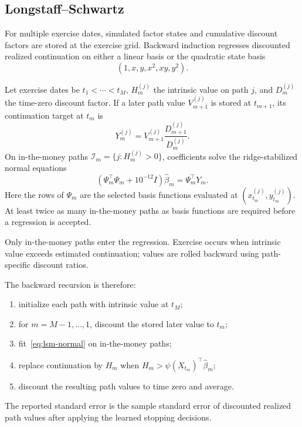 \documentclass[11pt]{article}
\numberwithin{equation}{section}
\theoremstyle{definition}
\theoremstyle{remark}
\begin{document}
\subsection{Longstaff--Schwartz}

For multiple exercise dates, simulated factor states and cumulative discount
factors are stored at the exercise grid. Backward induction regresses discounted
realized continuation on either a linear basis or the quadratic state basis
\begin{equation}
  (1,x,y,x^2,xy,y^2).
\end{equation}

Let exercise dates be $t_1<\cdots<t_M$, $H_m^{(j)}$ the intrinsic value on
path $j$, and $D_m^{(j)}$ the time-zero discount factor. If a later path value
$V_{m+1}^{(j)}$ is stored at $t_{m+1}$, its continuation target at $t_m$ is
\begin{equation}
  Y_m^{(j)}
  =V_{m+1}^{(j)}\frac{D_{m+1}^{(j)}}{D_m^{(j)}}.
\end{equation}
On in-the-money paths $\mathcal I_m=\{j:H_m^{(j)}>0\}$, coefficients solve the
ridge-stabilized normal equations
\begin{equation}
  (\Psi_m^\top\Psi_m+10^{-12}I)\widehat{\beta}_m
  =\Psi_m^\top Y_m.
  \label{eq:lsm-normal}
\end{equation}
Here the rows of $\Psi_m$ are the selected basis functions evaluated at
$(x_{t_m}^{(j)},y_{t_m}^{(j)})$. At least twice as many in-the-money paths as
basis functions are required before a regression is accepted.

Only in-the-money paths enter the regression. Exercise occurs when intrinsic
value exceeds estimated continuation; values are rolled backward using
path-specific discount ratios.

The backward recursion is therefore:
\begin{enumerate}
  \item initialize each path with intrinsic value at $t_M$;
  \item for $m=M-1,\ldots,1$, discount the stored later value to $t_m$;
  \item fit~\eqref{eq:lsm-normal} on in-the-money paths;
  \item replace continuation by $H_m$ when
    $H_m>\psi(X_{t_m})^\top\widehat{\beta}_m$;
  \item discount the resulting path values to time zero and average.
\end{enumerate}
The reported standard error is the sample standard error of discounted realized
path values after applying the learned stopping decisions.
\end{document}
